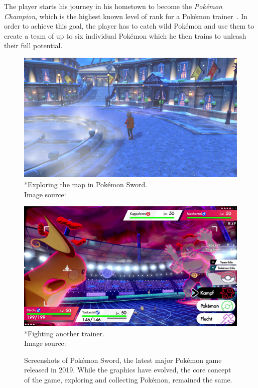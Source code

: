 The player starts his journey in his hometown to become the \textit{Pokémon Champion}, which is the highest known 
level of rank for a Pokémon trainer~\cite{Bulbapedia:Pokémon-Champion}. In order
to achieve this goal, the player has to catch wild Pokémon and use them to create a team of up to six individual 
Pokémon which he then trains to unleash their full potential. 
\begin{figure}
  \centering
  \begin{minipage}{.5\textwidth}
    \centering
    \includegraphics[width=.95\linewidth]{images/Sword-0.jpg}
    \captionsetup{margin=0.5cm}
    *{Exploring the map in Pokémon Sword.\\Image source:~\autocite{Pokemon:SwordMap}}
  \end{minipage}%
  \begin{minipage}{.5\textwidth}
    \centering
    \includegraphics[width=.95\linewidth]{images/Sword-1.jpg}
    \captionsetup{margin=0.5cm}
    *{Fighting another trainer. \\Image source:~\autocite{Nintendo:PokemonSchwert}}
  \end{minipage}
  \caption{Screenshots of Pokémon Sword, the latest major Pokémon game released in 2019. While the graphics have 
  evolved, the core concept of the game, exploring and collecting Pokémon, remained the same.}
  \label{fig:screenshot-sword}
\end{figure}
